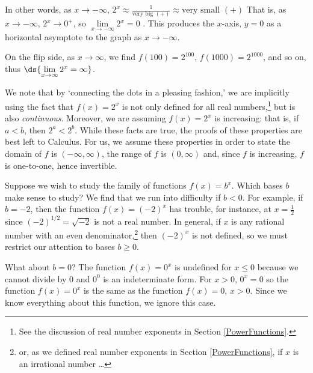 \documentclass{ximera}
\begin{document}
\smallskip

In other words, as $x \rightarrow -\infty$, $2^{x} \approx \frac{1}{\text{very big $(+)$}}  \approx \text{very small $(+)$}$   That is, as $x \rightarrow -\infty$, $2^{x} \rightarrow 0^{+}$, so $\lim\limits_{x \rightarrow -\infty} 2^{x} =0$ .  This produces the $x$-axis, $y = 0$ as a horizontal asymptote to the graph as $x \rightarrow -\infty$. 

\smallskip

On the flip side, as $x \rightarrow \infty$, we find $f(100) = 2^{100}$, $f(1000) = 2^{1000}$, and so on, thus $\ds{\lim_{x \rightarrow \infty} 2^{x} = \infty}$.  

\smallskip

We note that by  `connecting the dots in a pleasing fashion,' we are implicitly using the fact that $f(x) = 2^{x}$ is not only defined for all real numbers,\footnote{See the discussion of real number exponents in  Section \ref{PowerFunctions}.}  but  is also \textit{continuous}.   Moreover, we are assuming $f(x) = 2^{x}$ is increasing:  that is, if $a<b$, then $2^{a} < 2^{b}$. While these facts are true, the proofs of these properties are best left to Calculus. For us, we assume these properties in order to state the domain of $f$ is $(-\infty, \infty)$, the range of $f$ is $(0, \infty)$ and,  since $f$ is increasing, $f$ is one-to-one, hence invertible.
 
    
\smallskip

Suppose we wish to study the family of functions $f(x) = b^{x}$.  Which bases $b$ make sense to study?  We find that we run into difficulty if $b < 0$.  For example, if $b = -2$, then the function $f(x) = (-2)^{x}$ has trouble, for instance, at $x = \frac{1}{2}$ since $(-2)^{1/2} = \sqrt{-2}$ is not a real number. In general, if $x$ is any rational number with an even denominator,\footnote{or, as we defined real number exponents in Section \ref{PowerFunctions}, if $x$ is an irrational  number \ldots} then $(-2)^{x}$ is not defined, so we must restrict our attention to bases $b \geq 0$.  

\smallskip

What about $b = 0$?  The function $f(x) = 0^{x}$ is undefined for $x \leq 0$ because we cannot divide by $0$ and $0^{0}$ is an indeterminate form.  For $x > 0$, $0^{x} = 0$ so the function  $f(x) = 0^{x}$ is the same as the function $f(x) = 0$, $x > 0$. \label{indeterminantformtwo}  Since we know everything about this function, we ignore this case.
\smallskip
\end{document}
